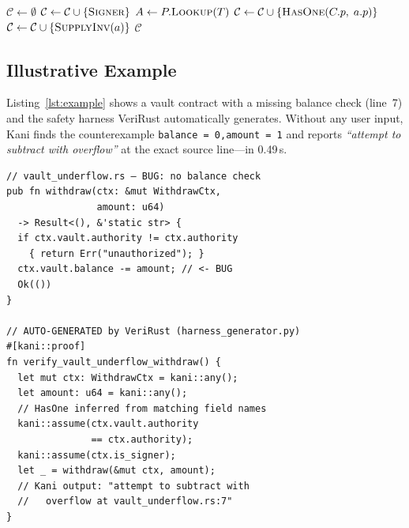 \documentclass[sigconf,review,anonymous]{acmart}
\begin{document}
\begin{algorithm}[t]
\caption{\textsc{InferConstraints}$(C, P)$}
\label{alg:infer}
\footnotesize
\begin{algorithmic}[1]
\State $\mathcal{C} \leftarrow \emptyset$
  \State $\mathcal{C} \leftarrow \mathcal{C} \cup \{\textsc{Signer}\}$
\EndIf
{}
  \State $A \leftarrow P.\textsc{Lookup}(T)$
    \State $\mathcal{C} \leftarrow \mathcal{C} \cup
      \{\textsc{HasOne}(C.p,\; a.p)\}$
  \EndFor
    \State $\mathcal{C} \leftarrow \mathcal{C} \cup
      \{\textsc{SupplyInv}(a)\}$
  \EndIf
\EndFor
\State \Return $\mathcal{C}$
\end{algorithmic}
\end{algorithm}

\subsection{Illustrative Example}

Listing~\ref{lst:example} shows a vault contract with a missing
balance check (line~7) and the safety harness VeriRust automatically
generates.
Without any user input, Kani finds the counterexample
\texttt{balance\,=\,0,\;amount\,=\,1} and reports
\emph{``attempt to subtract with overflow''} at the exact source
line---in 0.49\,s.

\begin{lstlisting}[caption={Buggy \texttt{withdraw} (top) and the
  auto-generated VeriRust safety harness (bottom).
  No specification was written.},label={lst:example}]
// vault_underflow.rs — BUG: no balance check
pub fn withdraw(ctx: &mut WithdrawCtx,
                amount: u64)
  -> Result<(), &'static str> {
  if ctx.vault.authority != ctx.authority
    { return Err("unauthorized"); }
  ctx.vault.balance -= amount; // <- BUG
  Ok(())
}

// AUTO-GENERATED by VeriRust (harness_generator.py)
#[kani::proof]
fn verify_vault_underflow_withdraw() {
  let mut ctx: WithdrawCtx = kani::any();
  let amount: u64 = kani::any();
  // HasOne inferred from matching field names
  kani::assume(ctx.vault.authority
               == ctx.authority);
  kani::assume(ctx.is_signer);
  let _ = withdraw(&mut ctx, amount);
  // Kani output: "attempt to subtract with
  //   overflow at vault_underflow.rs:7"
}
\end{lstlisting}
\end{document}
